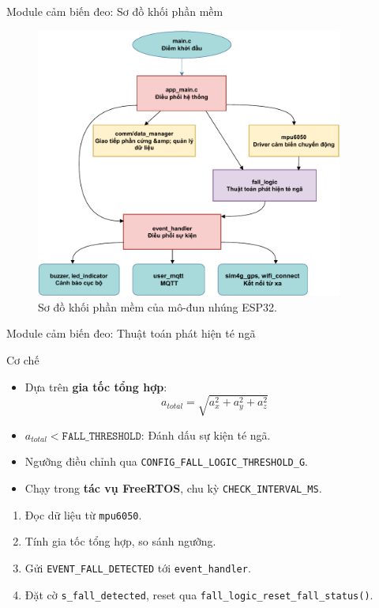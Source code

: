 \begin{frame}[fragile]{Module cảm biến đeo: Sơ đồ khối phần mềm}
    \begin{figure}
        \centering
        \includegraphics[width=0.9\textwidth,height=0.8\textheight,keepaspectratio]{images/module1_software_block-crop.pdf}
        \caption{Sơ đồ khối phần mềm của mô-đun nhúng ESP32.}
        \label{fig:module1_software_block}
    \end{figure}
\end{frame}

\begin{frame}{Module cảm biến đeo: Thuật toán phát hiện té ngã}
    \begin{block}{Cơ chế}
        \begin{itemize}
            \item Dựa trên \textbf{gia tốc tổng hợp}: 
            \[
            a_{total} = \sqrt{a_x^2 + a_y^2 + a_z^2}
            \]
            \item $a_{total} < \texttt{FALL\_THRESHOLD}$: Đánh dấu sự kiện té ngã.
            \item Ngưỡng điều chỉnh qua \texttt{CONFIG\_FALL\_LOGIC\_THRESHOLD\_G}.
            \item Chạy trong \textbf{tác vụ FreeRTOS}, chu kỳ \texttt{CHECK\_INTERVAL\_MS}.
        \end{itemize}
    \end{block}
    \begin{enumerate}
        \item Đọc dữ liệu từ \texttt{mpu6050}.
        \item Tính gia tốc tổng hợp, so sánh ngưỡng.
        \item Gửi \texttt{EVENT\_FALL\_DETECTED} tới \texttt{event\_handler}.
        \item Đặt cờ \texttt{s\_fall\_detected}, reset qua \texttt{fall\_logic\_reset\_fall\_status()}.
    \end{enumerate}
\end{frame}

